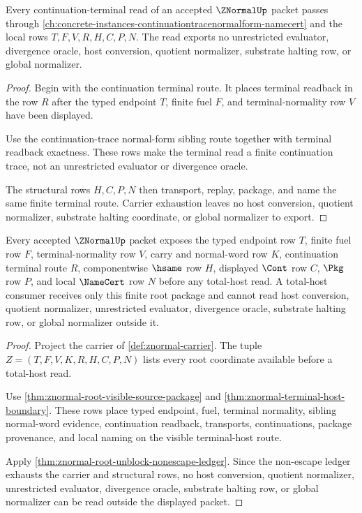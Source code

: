 \begin{theorem}
\label{thm:znormal-root-continuation-terminal-exhaustion}
Every continuation-terminal read of an accepted $\ZNormalUp$ packet passes
through \autoref{ch:concrete-instances-continuationtracenormalform-namecert}
and the local rows $T,F,V,R,H,C,P,N$. The read exports no unrestricted
evaluator, divergence oracle, host conversion, quotient normalizer, substrate
halting row, or global normalizer.
\end{theorem}
\begin{proof}
Begin with the continuation terminal route. It places terminal readback in the
row $R$ after the typed endpoint $T$, finite fuel $F$, and terminal-normality
row $V$ have been displayed.

Use the continuation-trace normal-form sibling route together with terminal
readback exactness. These rows make the terminal read a finite continuation
trace, not an unrestricted evaluator or divergence oracle.

The structural rows $H,C,P,N$ then transport, replay, package, and name the same
finite terminal route. Carrier exhaustion leaves no host conversion, quotient
normalizer, substrate halting coordinate, or global normalizer to export.
\end{proof}

\begin{theorem}
\label{thm:znormal-root-carrier-total-host-readiness}
Every accepted $\ZNormalUp$ packet exposes the typed endpoint row $T$, finite fuel row $F$, terminal-normality row $V$, carry and normal-word row $K$, continuation terminal route $R$, componentwise $\hsame$ row $H$, displayed $\Cont$ row $C$, $\Pkg$ row $P$, and local $\NameCert$ row $N$ before any total-host read. A total-host consumer receives only this finite root package and cannot read host conversion, quotient normalizer, unrestricted evaluator, divergence oracle, substrate halting row, or global normalizer outside it.
\end{theorem}
\begin{proof}
Project the carrier of \autoref{def:znormal-carrier}. The tuple $Z=(T,F,V,K,R,H,C,P,N)$ lists every root coordinate available before a total-host read.

Use \autoref{thm:znormal-root-visible-source-package} and \autoref{thm:znormal-terminal-host-boundary}. These rows place typed endpoint, fuel, terminal normality, sibling normal-word evidence, continuation readback, transports, continuations, package provenance, and local naming on the visible terminal-host route.

Apply \autoref{thm:znormal-root-unblock-nonescape-ledger}. Since the non-escape ledger exhausts the carrier and structural rows, no host conversion, quotient normalizer, unrestricted evaluator, divergence oracle, substrate halting row, or global normalizer can be read outside the displayed packet.
\end{proof}

